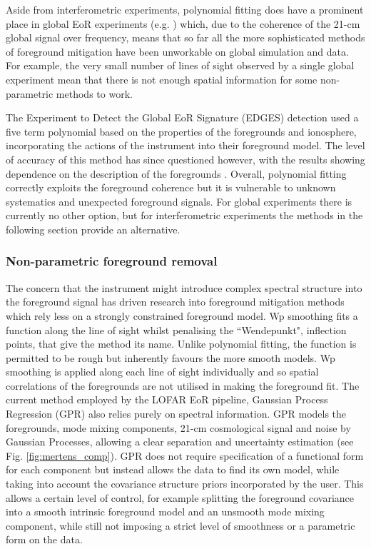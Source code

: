 Aside from interferometric experiments, polynomial fitting does have a prominent place in global EoR experiments (e.g. \citet{Singh2018ApJ...858...54S,Bowman2018Natur.555...67B}) which, due to the coherence of the 21-cm global signal over frequency, means that so far all the more sophisticated methods of foreground mitigation have been unworkable on global simulation and data. For example, the very small number of lines of sight observed by a single global experiment mean that there is not enough spatial information for some non-parametric methods to work.

The Experiment to Detect the Global EoR Signature (EDGES) detection \citep{Bowman2018Natur.555...67B} used a five term polynomial based on the properties of the foregrounds and ionosphere, incorporating the actions of the instrument into their foreground model. The level of accuracy of this method has since questioned however, with the results showing dependence on the description of the foregrounds \citep{Bradley2019ApJ...874..153B,Hills2018Natur.564E..32H}. Overall, polynomial fitting correctly exploits the foreground coherence but it is vulnerable to unknown systematics and unexpected foreground signals. For global experiments there is currently no other option, but for interferometric experiments the methods in the following section provide an alternative.

\subsubsection{Non-parametric foreground removal}
\label{sec:nonpar}
The concern that the instrument might introduce complex spectral structure into the foreground signal has driven research into foreground mitigation methods which rely less on a strongly constrained foreground model. Wp smoothing \citep{Harker2009MNRAS.397.1138H} fits a function along the line of sight whilst penalising the ``Wendepunkt", inflection points, that give the method its name. Unlike polynomial fitting, the function is permitted to be rough but inherently favours the more smooth models. Wp smoothing is applied along each line of sight individually and so spatial correlations of the foregrounds are not utilised in making the foreground fit. The current method employed by the LOFAR EoR pipeline, Gaussian Process Regression (GPR) \citet{Mertens2018MNRAS.478.3640M} also relies purely on spectral information. GPR models the foregrounds, mode mixing components, 21-cm cosmological signal and noise by Gaussian Processes, allowing a clear separation and uncertainty estimation (see Fig. \ref{fig:mertens_comp}). GPR does not require specification of a functional form for each component but instead allows the data to find its own model, while taking into account the covariance structure priors incorporated by the user. This allows a certain level of control, for example splitting the foreground covariance into a smooth intrinsic foreground model and an unsmooth mode mixing component, while still not imposing a strict level of smoothness or a parametric form on the data. 

